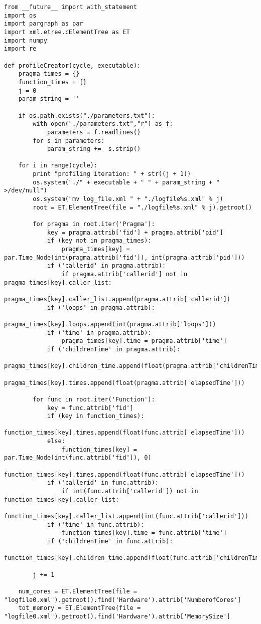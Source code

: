 \documentclass[a4paper,10pt,twoside]{book}
\begin{document}
\begin{lstlisting}[language=CCC, caption=profiler.py]
from __future__ import with_statement
import os
import pargraph as par
import xml.etree.cElementTree as ET
import numpy 
import re

def profileCreator(cycle, executable):
	pragma_times = {}
	function_times = {}
	j = 0
	param_string = ''

	if os.path.exists("./parameters.txt"):
		with open("./parameters.txt","r") as f:
			parameters = f.readlines()
		for s in parameters:
			param_string +=  s.strip()

	for i in range(cycle):
		print "profiling iteration: " + str((j + 1))
		os.system("./" + executable + " " + param_string + " >/dev/null")	
		os.system("mv log_file.xml " + "./logfile%s.xml" % j)
		root = ET.ElementTree(file = "./logfile%s.xml" % j).getroot()

		for pragma in root.iter('Pragma'):
			key = pragma.attrib['fid'] + pragma.attrib['pid']
			if (key not in pragma_times):
				pragma_times[key] = par.Time_Node(int(pragma.attrib['fid']), int(pragma.attrib['pid']))
			if ('callerid' in pragma.attrib):
				if pragma.attrib['callerid'] not in pragma_times[key].caller_list:
					pragma_times[key].caller_list.append(pragma.attrib['callerid'])
			if ('loops' in pragma.attrib):
				pragma_times[key].loops.append(int(pragma.attrib['loops']))
			if ('time' in pragma.attrib):
				pragma_times[key].time = pragma.attrib['time']
			if ('childrenTime' in pragma.attrib):
				pragma_times[key].children_time.append(float(pragma.attrib['childrenTime']))
			pragma_times[key].times.append(float(pragma.attrib['elapsedTime']))

		for func in root.iter('Function'):
			key = func.attrib['fid']
			if (key in function_times):
				function_times[key].times.append(float(func.attrib['elapsedTime']))
			else:
				function_times[key] = par.Time_Node(int(func.attrib['fid']), 0)
				function_times[key].times.append(float(func.attrib['elapsedTime']))
			if ('callerid' in func.attrib):
				if int(func.attrib['callerid']) not in function_times[key].caller_list:
					function_times[key].caller_list.append(int(func.attrib['callerid']))
			if ('time' in func.attrib):
				function_times[key].time = func.attrib['time']
			if ('childrenTime' in func.attrib):
				function_times[key].children_time.append(float(func.attrib['childrenTime']))

		j += 1

	num_cores = ET.ElementTree(file = "logfile0.xml").getroot().find('Hardware').attrib['NumberofCores']
	tot_memory = ET.ElementTree(file = "logfile0.xml").getroot().find('Hardware').attrib['MemorySize']


\end{lstlisting}
\end{document}
